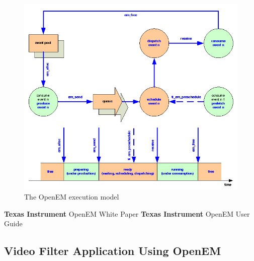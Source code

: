 \begin{figure}[h]
\begin{center}
\includegraphics[width=1.3\textwidth,natwidth=701,natheight=609]{openem_model.png}
\caption{The OpenEM execution model}\label{tiem}
\end{center}
\end{figure}

\textbf{Texas Instrument} OpenEM White Paper
\textbf{Texas Instrument} OpenEM User Guide


\subsection{Video Filter Application Using OpenEM}